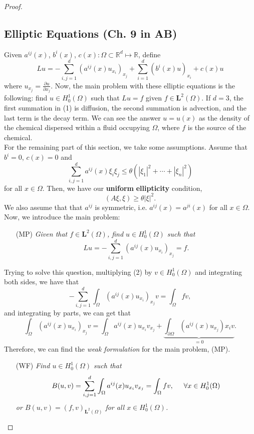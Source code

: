 \documentclass[oneside]{book}
\newcommand{\R}{{\mathbb R}}
\newcommand{\p}{\partial}
\newcommand{\Om}{\Omega}
\newcommand{\dint}{\displaystyle\int}
\newcommand{\dintom}{\dint_{\Om}}
\newcommand{\ml}{\mathbf{L}}
\newcommand{\sbs}{\subset}
\newcommand{\bi}{b^i}
\newcommand{\sumijd}{\sum\limits_{i, j = 1}^{d}}
\newcommand{\sumid}{\sum\limits_{i = 1}^{d}}
\newcommand{\aij}{a^{ij}}
\newcommand{\Hzo}{H_0^1(\Om)}
\newcommand{\mlto}{\ml^2(\Om)}
\begin{document}
\begin{proof}
\subsection*{Elliptic Equations (Ch. 9 in AB)}
Given $\aij(x)$, $\bi(x)$, $c(x) : \Om \sbs \R^d \mapsto \R$, define 
\begin{equation}
 Lu = - \sumijd (\aij(x) u_{x_i})_{x_j} + \sumid (\bi(x) u )_{x_i} + c(x) u
 \end{equation}
where $u_{x_j} = \frac{\p u}{\p x_j}$. Now, the main problem with these elliptic equations is the following: find $u \in \Hzo$ such that $Lu = f$ given $f \in \mlto$. If $d = 3$, the first summation in (1) is diffusion, the second summation is advection, and the last term is the decay term. We can see the answer $u = u(x)$ as the density of the chemical dispersed within a fluid occupying $\Om$, where $f$ is the source of the chemical. \\
\indent For the remaining part of this section, we take some assumptions. Assume that $\bi = 0$, $c(x) = 0$ and 
\[ \sumijd \aij(x) \xi_i \xi_j \leq \theta \left( |\xi_1|^2 + \cdots + |\xi_n|^2 \right)\]
for all $x \in \Om$. Then, we have our \textbf{uniform} \textbf{ellipticity} condition, 
\[ (A \xi, \xi) \geq \theta |\xi|^2.\]
We also assume that that $a^{ij}$ is symmetric, i.e. $\aij(x) = a^{ji}(x)$ for all $x \in \Om$. Now, we introduce the main problem:
\begin{enumerate}
\item[(MP)] \textit{Given that $f \in \mlto$, find $u \in \Hzo$ such that }
\begin{equation}
Lu  =  - \sumijd (\aij(x) u_{x_i} )_{x_j} = f.
\end{equation}
\end{enumerate}
Trying to solve this question, multiplying (2) by $v \in \Hzo$ and integrating both sides, we have that 
\[ - \sumijd \dintom (\aij(x) u_{x_i})_{x_j} v = \dintom fv,\]
and integrating by parts, we can get that 
\[\dintom (\aij(x) u_{x_i})_{x_j} v  = \dintom \aij(x) u_{x_i} v_{x_j} + \underbrace{\dint_{\p \Omega} (\aij(x) u_{x_j}){x_i} v}_{ = 0}. \]
Therefore, we can find the \textit{weak formulation} for the main problem, (MP).
 \begin{enumerate}
\item[(WF)] \textit{Find $u \in \Hzo$ such that}
\[ B(u, v) = \sumijd \dintom \aij (x) u_{x_i} v_{x_j} = \dintom fv, \hspace{5mm} \forall x \in \Hzo\]
\textit{or $B(u, v) = (f, v)_{\mlto}$ for all $x \in \Hzo$.}
\end{enumerate}

\end{proof}
\end{document}
